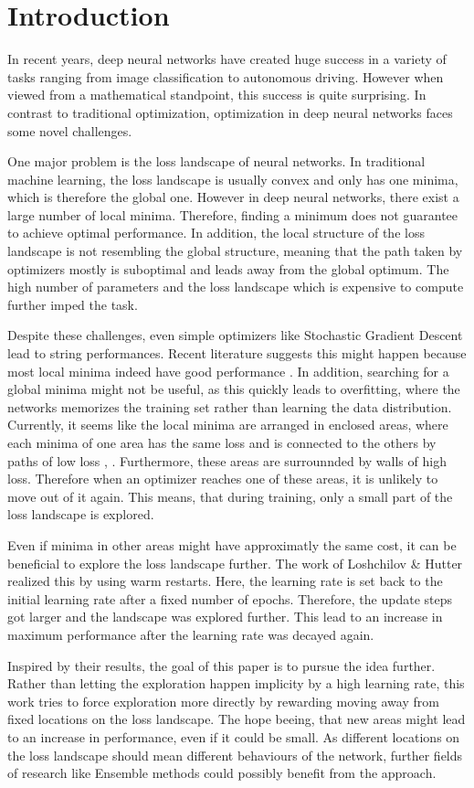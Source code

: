 \chapter{Introduction}\label{cha:Introduction}
In recent years, deep neural networks have created huge success in a variety of
tasks ranging from image classification to autonomous driving. However when
viewed from a mathematical standpoint, this success is quite surprising. In
contrast to traditional optimization, optimization in deep neural networks faces
some novel challenges.

One major problem is the loss landscape of neural networks. In traditional
machine learning, the loss landscape is usually convex and only has one minima,
which is therefore the global one. However in deep neural networks, there exist
a large number of local minima. Therefore, finding a minimum does not guarantee
to achieve optimal performance. In addition, the local structure of the loss
landscape is not resembling the global structure, meaning that the path taken by
optimizers mostly is suboptimal and leads away from the global optimum. The high
number of parameters and the loss landscape which is expensive to compute
further imped the task.

Despite these challenges, even simple optimizers like Stochastic Gradient
Descent lead to string performances. Recent literature suggests this might
happen because most local minima indeed have good performance
\cite{choromanska2015loss}. In addition, searching for a global minima might not
be useful, as this quickly leads to overfitting, where the networks memorizes
the training set rather than learning the data distribution. Currently, it seems
like the local minima are arranged in enclosed areas, where each minima of one area has
the same loss and is connected to the others by paths of low loss \cite{he2020piecewise},
\cite{draxler2018essentially}. Furthermore, these areas are surrounnded by walls
of high loss. Therefore when an optimizer reaches one of these areas, it is
unlikely to move out of it again. This means, that during training, only a small
part of the loss landscape is explored.

Even if minima in other areas might have approximatly the same cost, it can be
beneficial to explore the loss landscape further. The work of Loshchilov \&
Hutter \cite{loshchilov2016sgdr} realized this by using warm restarts. Here, the
learning rate is set back to the initial learning rate after a fixed number of
epochs. Therefore, the update steps got larger and the landscape was explored
further. This lead to an increase in maximum performance after the learning rate
was decayed again.

Inspired by their results, the goal of this paper is to pursue the idea further.
Rather than letting the exploration happen implicity by a high learning rate,
this work tries to force exploration more directly by rewarding moving away from
fixed locations on the loss landscape. The hope beeing, that new areas might
lead to an increase in performance, even if it could be small. As different
locations on the loss landscape should mean different behaviours of the network,
further fields of research like Ensemble methods could possibly benefit from the
approach.

